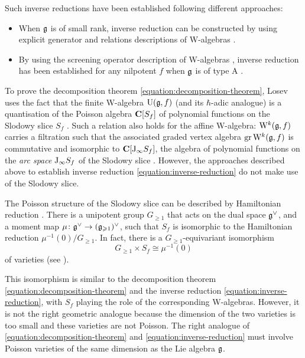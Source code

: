 Such inverse reductions have been established following different approaches:
\begin{itemize}
	\item When $\mathfrak g$ is of small rank, inverse reduction can be constructed by using explicit generator and relations descriptions of W-algebras \cite{semikhatov1994inverting,adamovic2019realizations,adamovic2021realisation,adamovic2024relaxed}.
	
	\item By using the screening operator description of W-algebras \cite{genra2020screening}, inverse reduction has been established for any nilpotent $f$ when $\mathfrak g$ is of type A \cite{fehily2023subregular,fehily2024inverse,fasquel2026connecting,fasquel2026quantum}.
\end{itemize}


To prove the decomposition theorem \eqref{equation:decomposition-theorem}, Losev uses the fact that the finite W-algebra $\mathrm U(\mathfrak g, f)$ (and its $\hbar$-adic analogue) is a quantisation of the Poisson algebra $\mathbf{C}[S_f]$ of polynomial functions on the Slodowy slice $S_f$ \cite{premet2002special,gan2002quantization}. Such a relation also holds for the affine W-algebra: $\mathrm W^k(\mathfrak g, f)$ carries a filtration \cite{li2004vertex,li2005abelianizing} such that the associated graded vertex algebra $\operatorname{gr} \mathrm W^k(\mathfrak g, f)$ is commutative and isomorphic to $\mathbf{C}[\mathrm{J}_\infty S_f]$, the algebra of polynomial functions on the \emph{arc space} $\mathrm{J}_\infty S_f$ of the Slodowy slice \cite{desole2006finite,arakawa2015associated}. However, the approaches described above to establish inverse reduction \eqref{equation:inverse-reduction} do not make use of the Slodowy slice.

The Poisson structure of the Slodowy slice can be described by Hamiltonian reduction \cite{kostant1978whittaker,premet2002special,gan2002quantization}. There is a unipotent group $G_{\geqslant 1}$ that acts on the dual space $\mathfrak g^\vee$, and a moment map $\mu \colon \mathfrak g^\vee \rightarrow (\mathfrak g_{\geqslant 1})^\vee$, such that $S_f$ is isomorphic to the Hamiltonian reduction $\mu^{-1}(0) / G_{\geqslant 1}$. In fact, there is a $G_{\geqslant 1}$-equivariant isomorphism
\begin{equation} \label{equation:gan-ginzburg} 
	G_{\geqslant 1} \times S_f \cong \mu^{-1}(0) 
\end{equation}
of varieties (see ). 

This isomorphism is similar to the decomposition theorem \eqref{equation:decomposition-theorem} and the inverse reduction \eqref{equation:inverse-reduction}, with $S_f$ playing the role of the corresponding W-algebras. However, it is not the right geometric analogue because the dimension of the two varieties is too small and these varieties are not Poisson. The right analogue of \eqref{equation:decomposition-theorem} and \eqref{equation:inverse-reduction} must involve Poisson varieties of the same dimension as the Lie algebra $\mathfrak g$. 

